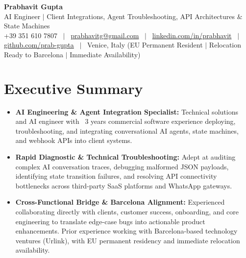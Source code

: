 \documentclass[a4paper,10pt]{article}
\begin{document}
\begin{minipage}[c]{0.80\textwidth}
  {\Huge\bfseries Prabhavit Gupta}\\[3pt]
  {\color{accent}\large AI Engineer $\vert$ Client Integrations, Agent Troubleshooting, API Architectures $\&$ State Machines}\\[6pt]
  {\footnotesize +39 351 610 7807 ~$\vert$~
  \href{mailto:prabhavitg@gmail.com}{prabhavitg@gmail.com} ~$\vert$~
  \href{https://www.linkedin.com/in/prabhavit/}{linkedin.com/in/prabhavit} ~$\vert$~
  \href{https://github.com/prab-gupta}{github.com/prab-gupta} ~$\vert$~
  Venice, Italy (EU Permanent Resident $\vert$ Relocation Ready to Barcelona $\vert$ Immediate Availability)}
\end{minipage}\hfill

\vspace{6pt}

\section{Executive Summary}
\begin{itemize}
  \item \textbf{AI Engineering \& Agent Integration Specialist:} Technical solutions and AI engineer with ~3 years commercial software experience deploying, troubleshooting, and integrating conversational AI agents, state machines, and webhook APIs into client systems.
  \item \textbf{Rapid Diagnostic \& Technical Troubleshooting:} Adept at auditing complex AI conversation traces, debugging malformed JSON payloads, identifying state transition failures, and resolving API connectivity bottlenecks across third-party SaaS platforms and WhatsApp gateways.
  \item \textbf{Cross-Functional Bridge \& Barcelona Alignment:} Experienced collaborating directly with clients, customer success, onboarding, and core engineering to translate edge-case bugs into actionable product enhancements. Prior experience working with Barcelona-based technology ventures (Urlink), with EU permanent residency and immediate relocation availability.
\end{itemize}

\end{document}
